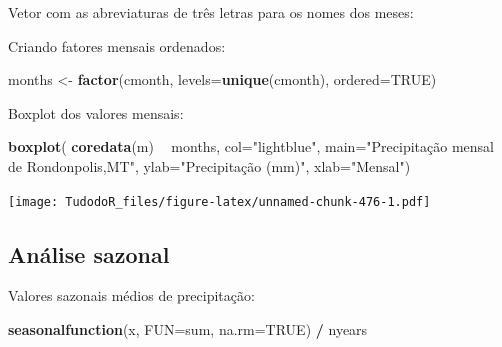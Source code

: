 \documentclass[
]{book}
\newenvironment{Shaded}{\begin{snugshade}}{\end{snugshade}}
\newcommand{\DataTypeTok}[1]{\textcolor[rgb]{0.13,0.29,0.53}{#1}}
\newcommand{\KeywordTok}[1]{\textcolor[rgb]{0.13,0.29,0.53}{\textbf{#1}}}
\newcommand{\NormalTok}[1]{#1}
\newcommand{\OperatorTok}[1]{\textcolor[rgb]{0.81,0.36,0.00}{\textbf{#1}}}
\newcommand{\OtherTok}[1]{\textcolor[rgb]{0.56,0.35,0.01}{#1}}
\newcommand{\StringTok}[1]{\textcolor[rgb]{0.31,0.60,0.02}{#1}}
\begin{document}
Vetor com as abreviaturas de três letras para os nomes dos meses:

\begin{Shaded}
\end{Shaded}

Criando fatores mensais ordenados:

\begin{Shaded}
\begin{Highlighting}[]
\NormalTok{months <-}\StringTok{ }\KeywordTok{factor}\NormalTok{(cmonth, }\DataTypeTok{levels=}\KeywordTok{unique}\NormalTok{(cmonth), }\DataTypeTok{ordered=}\OtherTok{TRUE}\NormalTok{)}
\end{Highlighting}
\end{Shaded}

Boxplot dos valores mensais:

\begin{Shaded}
\begin{Highlighting}[]
\KeywordTok{boxplot}\NormalTok{( }\KeywordTok{coredata}\NormalTok{(m) }\OperatorTok{~}\StringTok{ }\NormalTok{months, }
         \DataTypeTok{col=}\StringTok{"lightblue"}\NormalTok{, }
         \DataTypeTok{main=}\StringTok{"Precipitação mensal de Rondonpolis,MT"}\NormalTok{,}
        \DataTypeTok{ylab=}\StringTok{"Precipitação (mm)"}\NormalTok{, }\DataTypeTok{xlab=}\StringTok{"Mensal"}\NormalTok{)}
\end{Highlighting}
\end{Shaded}

\texttt{[image: TudodoR\_files/figure-latex/unnamed-chunk-476-1.pdf]}

\hypertarget{anuxe1lise-sazonal}{%
\subsection{Análise sazonal}\label{anuxe1lise-sazonal}}

Valores sazonais médios de precipitação:

\begin{Shaded}
\begin{Highlighting}[]
\KeywordTok{seasonalfunction}\NormalTok{(x, }\DataTypeTok{FUN=}\NormalTok{sum, }\DataTypeTok{na.rm=}\OtherTok{TRUE}\NormalTok{) }\OperatorTok{/}\StringTok{ }\NormalTok{nyears}
\end{Highlighting}
\end{Shaded}
\end{document}
